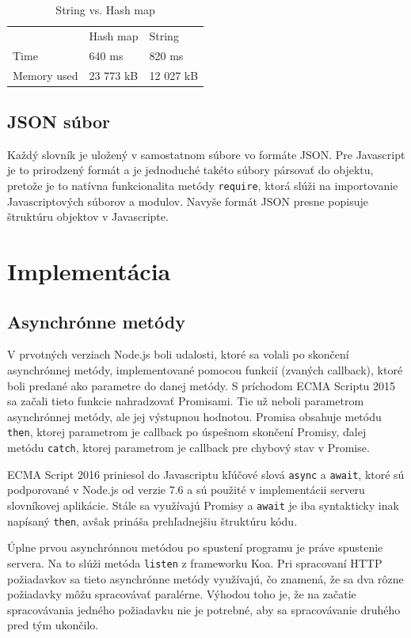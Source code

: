 \documentclass[
  digital, %
  table,   %
  lof,     %
  lot,     %
]{fithesis3}
\begin{document}
\begin{table}[]
\centering
\caption{String vs. Hash map}
\label{tab:string-hash}
\begin{tabular}{lll}
     & Hash map & String   \\
Time & 640 ms   & 820 ms   \\
Memory used & 23 773 kB & 12 027 kB
\end{tabular}
\end{table}

\subsection{JSON súbor}
Každý slovník je uložený v samostatnom súbore vo formáte JSON. Pre Javascript je to prirodzený formát a je jednoduché takéto súbory pársovať do objektu, pretože je to natívna funkcionalita metódy \texttt{require}, ktorá slúži na importovanie Javascriptových súborov a modulov. Navyše formát JSON presne popisuje štruktúru objektov v Javascripte.


\section{Implementácia}
\subsection{Asynchrónne metódy}
V prvotných verziach Node.js boli udalosti, ktoré sa volali po skončení asynchrónnej metódy, implementované pomocou funkcií (zvaných callback), ktoré boli predané ako parametre do danej metódy. S príchodom ECMA Scriptu 2015 sa začali tieto funkcie nahradzovať Promisami. Tie už neboli parametrom asynchrónnej metódy, ale jej výstupnou hodnotou. Promisa obsahuje metódu \texttt{then}, ktorej parametrom je callback po úspešnom skončení Promisy, ďalej metódu \texttt{catch}, ktorej parametrom je callback pre chybový stav v Promise.

ECMA Script 2016 priniesol do Javascriptu kľúčové slová \texttt{async} a \texttt{await}, ktoré sú podporované v Node.js od verzie 7.6 a sú použité v implementácii serveru slovníkovej aplikácie. Stále sa využívajú Promisy a \texttt{await} je iba syntakticky inak napísaný \texttt{then}, avšak prináša prehľadnejšiu štruktúru kódu.

Úplne prvou asynchrónnou metódou po spustení programu je práve spustenie servera. Na to slúži metóda \texttt{listen} z frameworku Koa. Pri spracovaní HTTP požiadavkov sa tieto asynchrónne metódy využívajú, čo znamená, že sa dva rôzne požiadavky môžu spracovávať paralérne. Výhodou toho je, že na začatie spracovávania jedného požiadavku nie je potrebné, aby sa spracovávanie druhého pred tým ukončilo.
\end{document}
